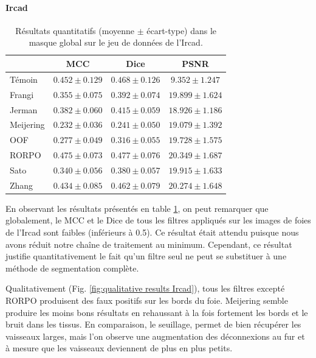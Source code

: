 \paragraph{Ircad}

\begin{table}[!ht]
  \begin{center}
      \caption{Résultats quantitatifs (moyenne $\pm$ écart-type) dans le masque global \maskglobal sur le jeu de données de l'Ircad.}
      \label{tab:quantitative results Ircad}
      \begin{tabular}{lccc}
          \hline
          & MCC & Dice & PSNR \\ 
          \hline
          Témoin	& $ 0.452 \pm 0.129	$ & $ 0.468 \pm	0.126 $ & $	9.352  \pm  1.247 $ \\
          Frangi	    & $ 0.355 \pm 0.075	$ & $ 0.392 \pm	0.074 $ & $	19.899 \pm 	1.624 $ \\
          Jerman	    & $ 0.382 \pm 0.060	$ & $ 0.415 \pm	0.059 $ & $	18.926 \pm 	1.186 $ \\
          Meijering   & $ 0.232 \pm 0.036	$ & $ 0.241 \pm	0.050 $ & $	19.079 \pm 	1.392 $ \\
          OOF	        & $ 0.277 \pm 0.049	$ & $ 0.316 \pm	0.055 $ & $	19.728 \pm 	1.575 $ \\
          RORPO	    & $ 0.475 \pm 0.073	$ & $ 0.477 \pm	0.076 $ & $	20.349 \pm 	1.687 $ \\
          Sato	    & $ 0.340 \pm 0.056	$ & $ 0.380 \pm	0.057 $ & $	19.915 \pm 	1.633 $ \\
          Zhang	    & $ 0.434 \pm 0.085	$ & $ 0.462 \pm	0.079 $ & $	20.274 \pm 	1.648 $ \\
    
          \hline
      \end{tabular}  
      \end{center}    
\end{table}

En observant les résultats présentés en table \ref{tab:quantitative results Ircad}, on peut remarquer que globalement, le MCC et le Dice de tous les filtres appliqués sur les images de foies de l'Ircad sont faibles (inférieurs à 0.5). Ce résultat était attendu puisque nous avons réduit notre chaîne de traitement au minimum. Cependant, ce résultat justifie quantitativement le fait qu'un filtre seul ne peut se substituer à une méthode de segmentation complète.

Qualitativement (Fig. \ref{fig:qualitative results Ircad}), tous les filtres excepté RORPO produisent des faux positifs sur les bords du foie. Meijering semble produire les moins bons résultats en rehaussant à la fois fortement les bords et le bruit dans les tissus. En comparaison, le seuillage, permet de bien récupérer les vaisseaux larges, mais l'on observe une augmentation des déconnexions au fur et à mesure que les vaisseaux deviennent de plus en plus petits. 

